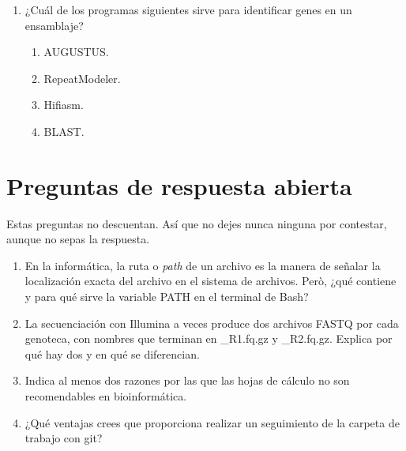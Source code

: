 \documentclass[a4paper,12pt]{article}
\begin{document}
\begin{enumerate}
\item ¿Cuál de los programas siguientes sirve para identificar genes en un ensamblaje?
   \begin{enumerate}
   \item AUGUSTUS.
   \item RepeatModeler.
   \item Hifiasm.
   \item BLAST.
   \end{enumerate}

\end{enumerate}

\section*{Preguntas de respuesta abierta}
Estas preguntas no descuentan. Así que no dejes nunca ninguna por contestar,
aunque no sepas la respuesta.

\begin{enumerate}
\item En la informática, la ruta o \emph{path} de un archivo es la manera de señalar la
localización exacta del archivo en el sistema de archivos. Però, ¿qué contiene y para
qué sirve la variable \textsf{PATH} en el terminal de Bash?


\item La secuenciación con Illumina a veces produce dos archivos FASTQ por cada genoteca,
con nombres que terminan en \textsf{\_R1.fq.gz} y \textsf{\_R2.fq.gz}. Explica por qué hay
dos y en qué se diferencian.


\item Indica al menos dos razones por las que las hojas de cálculo no son recomendables
en bioinformática.


\item ¿Qué ventajas crees que proporciona realizar un seguimiento de la carpeta de trabajo con
\textsf{git}?

\end{enumerate}
\end{document}
